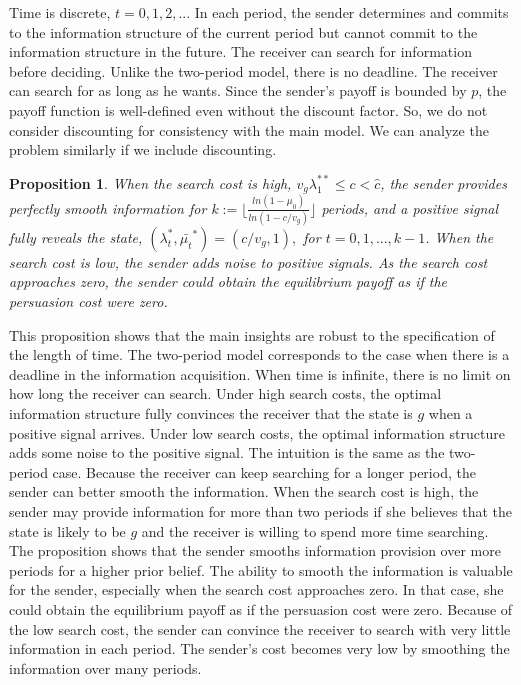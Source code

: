 \documentclass[11pt]{extarticle}
\newtheorem{proposition}{Proposition}
\begin{document}
Time is discrete, $t = 0, 1, 2, ...$ In each period, the sender determines and commits to the information structure of the current period but cannot commit to the information structure in the future. The receiver can search for information before deciding. Unlike the two-period model, there is no deadline. The receiver can search for as long as he wants. Since the sender's payoff is bounded by $p$, the payoff function is well-defined even without the discount factor. So, we do not consider discounting for consistency with the main model. We can analyze the problem similarly if we include discounting.

\begin{proposition}\label{infinite-period}
	When the search cost is high, $v_g\lambda_1^{**} \leq c < \widehat{c}$, the sender provides perfectly smooth information for $k := \lfloor \frac{ln(1-\mu_0)}{ln(1-c/v_g)} \rfloor$ periods, and a positive signal fully reveals the state, $(\lambda_t^*,\bar{\mu_t}^*)=(c/v_g,1),$ for $t = 0,1,...,k-1$. When the search cost is low, the sender adds noise to positive signals. As the search cost approaches zero, the sender could obtain the equilibrium payoff as if the persuasion cost were zero.
\end{proposition}

This proposition shows that the main insights are robust to the specification of the length of time. The two-period model corresponds to the case when there is a deadline in the information acquisition. When time is infinite, there is no limit on how long the receiver can search. Under high search costs, the optimal information structure fully convinces the receiver that the state is $g$ when a positive signal arrives. Under low search costs, the optimal information structure adds some noise to the positive signal. The intuition is the same as the two-period case. Because the receiver can keep searching for a longer period, the sender can better smooth the information. When the search cost is high, the sender may provide information for more than two periods if she believes that the state is likely to be $g$ and the receiver is willing to spend more time searching. The proposition shows that the sender smooths information provision over more periods for a higher prior belief. The ability to smooth the information is valuable for the sender, especially when the search cost approaches zero. In that case, she could obtain the equilibrium payoff as if the persuasion cost were zero. Because of the low search cost, the sender can convince the receiver to search with very little information in each period. The sender's cost becomes very low by smoothing the information over many periods.
\end{document}
